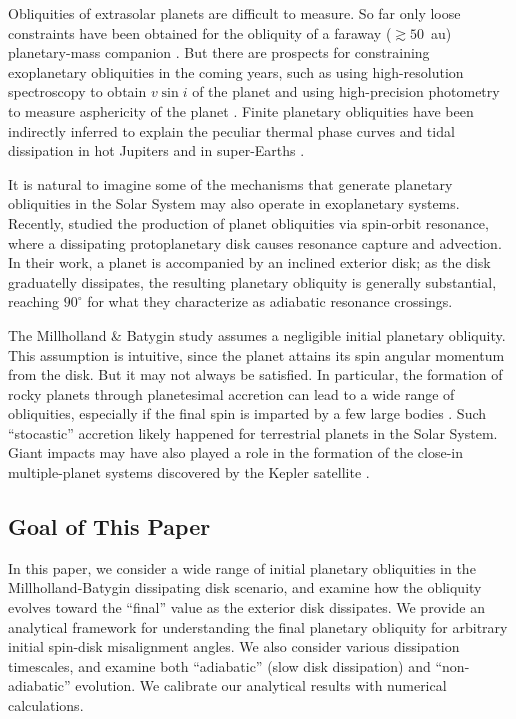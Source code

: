\documentclass[
        fleqn,
        usenatbib,
    ]{mnras}
\begin{document}
Obliquities of extrasolar planets are difficult to measure. So far only loose
constraints have been obtained for the obliquity of a faraway ($\gtrsim 50$~au)
planetary-mass companion \citep{bryan2020obliquity}. But there are prospects for
constraining exoplanetary obliquities in the coming years, such as using
high-resolution spectroscopy to obtain $v\sin i$ of the planet
\citep{snellen2014fast, bryan2018constraints} and using high-precision
photometry to measure asphericity of the planet \citep{seager2002constraining}.
Finite planetary obliquities have been indirectly inferred to explain the
peculiar thermal phase curves \citep[see e.g.][]{millholland_signatures,
ohno_infer_obl} and tidal dissipation in hot Jupiters
\citep{millholland_wasp12b} and in super-Earths
\citep{millholland2019obliquity}.

It is natural to imagine some of the mechanisms that generate planetary
obliquities in the Solar System may also operate in exoplanetary systems.
Recently, \citet{millholland_disk} studied the production of planet obliquities
via spin-orbit resonance, where a dissipating protoplanetary disk causes
resonance capture and advection. In their work, a planet is accompanied by an
inclined exterior disk; as the disk graduatelly dissipates, the resulting
planetary obliquity is generally substantial, reaching $90^\circ$ for what they
characterize as adiabatic resonance crossings.

The Millholland \& Batygin study assumes a negligible initial planetary
obliquity. This assumption is intuitive, since the planet attains its spin
angular momentum from the disk. But it may not always be satisfied. In
particular, the formation of rocky planets through planetesimal accretion can
lead to a wide range of obliquities, especially if the final spin is imparted by
a few large bodies \citep{dones1993does, lissauer1997accretion,
miguel2010planet}. Such ``stocastic'' accretion likely happened for terrestrial
planets in the Solar System. Giant impacts may have also played a role in the
formation of the close-in multiple-planet systems discovered by the Kepler
satellite \citep[e.g.][]{inamdar2015formation, izidoro2017breaking}.

\subsection{Goal of This Paper}

In this paper, we consider a wide range of initial planetary obliquities in the
Millholland-Batygin dissipating disk scenario, and examine how the obliquity
evolves toward the ``final'' value as the exterior disk dissipates. We provide
an analytical framework for understanding the final planetary obliquity for
arbitrary initial spin-disk misalignment angles. We also consider various
dissipation timescales, and examine both ``adiabatic'' (slow disk dissipation)
and ``non-adiabatic'' evolution. We calibrate our analytical results with
numerical calculations.
\end{document}
